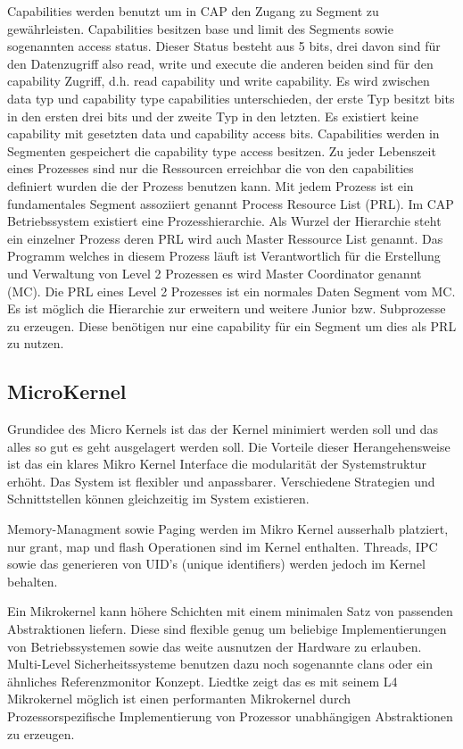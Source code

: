 \documentclass[9pt,technote]{IEEEtran}
\begin{document}
     
     Capabilities werden benutzt um in CAP den Zugang zu Segment zu gew\"ahrleisten. Capabilities besitzen base und limit des Segments sowie sogenannten access status. Dieser Status
     besteht aus 5 bits, drei davon sind f\"ur den Datenzugriff also read, write und execute die anderen beiden sind f\"ur den capability Zugriff,
     d.h. read capability und write capability. Es wird zwischen data typ und capability type capabilities unterschieden, der erste Typ besitzt bits in den ersten drei bits und
     der zweite Typ in den letzten. Es existiert keine capability mit gesetzten data und capability access bits. Capabilities werden in Segmenten gespeichert die
     capability type access besitzen. Zu jeder Lebenszeit eines Prozesses sind nur die Ressourcen erreichbar die von den capabilities definiert wurden die der Prozess
     benutzen kann. Mit jedem Prozess ist ein fundamentales Segment assoziiert genannt Process Resource List (PRL). 
     Im CAP Betriebssystem existiert eine Prozesshierarchie. Als Wurzel der Hierarchie steht ein einzelner Prozess deren PRL wird auch Master Ressource List genannt.    
     Das Programm welches in diesem Prozess l\"auft ist Verantwortlich f\"ur die Erstellung und Verwaltung von Level 2 Prozessen es wird Master Coordinator genannt (MC).
     Die PRL eines Level 2 Prozesses ist ein normales Daten Segment vom MC. Es ist m\"oglich die Hierarchie zur erweitern und weitere Junior bzw. Subprozesse zu erzeugen.
     Diese ben\"otigen nur eine capability f\"ur ein Segment um dies als PRL zu nutzen.
  \subsection{MicroKernel}
    Grundidee des Micro Kernels ist das der Kernel minimiert werden soll und das alles so gut es geht ausgelagert werden soll.
    Die Vorteile dieser Herangehensweise ist das ein klares Mikro Kernel Interface die modularit\"at der Systemstruktur erh\"oht.
    Das System ist flexibler und anpassbarer. Verschiedene Strategien und Schnittstellen k\"onnen gleichzeitig im System existieren.
    
    Memory-Managment sowie Paging werden im Mikro Kernel ausserhalb platziert, nur grant, map und flash Operationen sind im Kernel enthalten. \cite[S. 238 f]{inproc:micro}
    Threads, IPC sowie das generieren von UID's (unique identifiers) werden jedoch im Kernel behalten.
    
    Ein Mikrokernel kann h\"ohere Schichten mit einem minimalen Satz von passenden Abstraktionen liefern.
    Diese sind flexible genug um beliebige Implementierungen von Betriebssystemen sowie das weite ausnutzen der Hardware zu erlauben.
    Multi-Level Sicherheitssysteme benutzen dazu noch sogenannte clans oder ein \"ahnliches Referenzmonitor Konzept.        
    Liedtke zeigt das es mit seinem L4 Mikrokernel m\"oglich ist einen performanten Mikrokernel durch Prozessorspezifische Implementierung 
    von Prozessor unabh\"angigen Abstraktionen zu erzeugen.\cite[S. 248]{inproc:micro}
\end{document}
